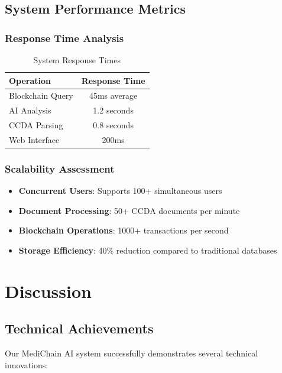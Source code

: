 \documentclass[conference]{IEEEtran}
\begin{document}
\subsection{System Performance Metrics}

\subsubsection{Response Time Analysis}
\begin{table}[H]
\centering
\caption{System Response Times}
\begin{tabular}{|l|c|}
\hline
\textbf{Operation} & \textbf{Response Time} \\
\hline
Blockchain Query & 45ms average \\
AI Analysis & 1.2 seconds \\
CCDA Parsing & 0.8 seconds \\
Web Interface & 200ms \\
\hline
\end{tabular}
\end{table}

\subsubsection{Scalability Assessment}
\begin{itemize}
    \item \textbf{Concurrent Users}: Supports 100+ simultaneous users
    \item \textbf{Document Processing}: 50+ CCDA documents per minute
    \item \textbf{Blockchain Operations}: 1000+ transactions per second
    \item \textbf{Storage Efficiency}: 40\% reduction compared to traditional databases
\end{itemize}

\section{Discussion}

\subsection{Technical Achievements}

Our MediChain AI system successfully demonstrates several technical innovations:
\end{document}
